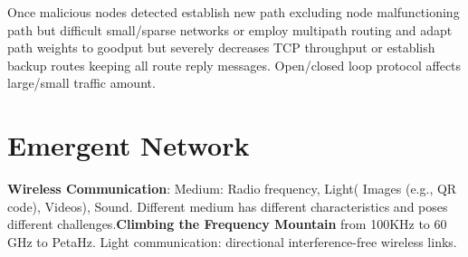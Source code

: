 \documentclass[9pt]{extarticle}
\begin{document}
\begin{multicols}{2}
Once malicious nodes detected establish new path excluding node malfunctioning path but difficult small/sparse networks or employ multipath routing and adapt path weights to goodput but severely decreases TCP throughput or establish backup routes keeping all route reply messages. Open/closed loop protocol affects large/small traffic amount.

\section{Emergent Network}
\textbf{Wireless Communication}: Medium: Radio frequency, Light( Images (e.g., QR code), Videos), Sound. Different medium has different characteristics and poses different challenges.\textbf{Climbing the Frequency Mountain} from 100KHz to 60 GHz to PetaHz. Light communication: directional interference-free wireless links. 


\end{multicols}
\end{document}
